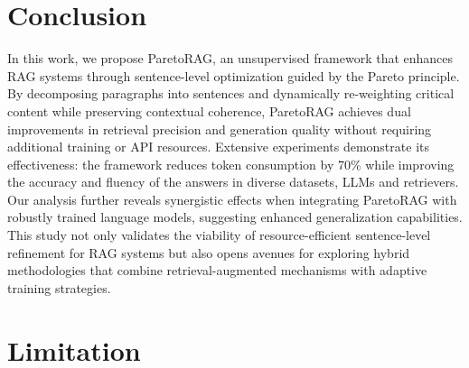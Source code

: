 \section{Conclusion}
In this work, we propose ParetoRAG, an unsupervised framework that enhances RAG systems through sentence-level optimization guided by the Pareto principle. By decomposing paragraphs into sentences and dynamically re-weighting critical content while preserving contextual coherence, ParetoRAG achieves dual improvements in retrieval precision and generation quality without requiring additional training or API resources. Extensive experiments demonstrate its effectiveness: the framework reduces token consumption by 70\% while improving the accuracy and fluency of the answers in diverse datasets, LLMs and retrievers. Our analysis further reveals synergistic effects when integrating ParetoRAG with robustly trained language models, suggesting enhanced generalization capabilities. This study not only validates the viability of resource-efficient sentence-level refinement for RAG systems but also opens avenues for exploring hybrid methodologies that combine retrieval-augmented mechanisms with adaptive training strategies.

\section{Limitation}




